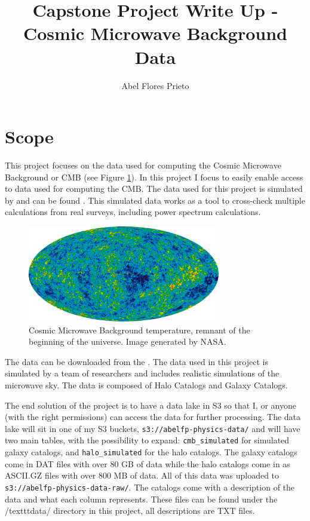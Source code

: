\documentclass[12pt,letterpaper]{article}
\author{Abel Flores Prieto}
\title{Capstone Project Write Up - Cosmic Microwave Background Data}
\newcommand{\MYhref}[3][blue]{\href{#2}{\color{#1}{#3}}}%
\begin{document}
\maketitle

\section*{Scope}
This project focuses on the data used for computing the Cosmic Microwave
Background or CMB (see Figure \ref{fig:cmb}). In this project I focus to easily
enable access to data used for computing the CMB. The data used for this
project is simulated by \MYhref{https://arxiv.org/abs/0908.0540}{Sehgal et al.
(2010)} and can be found
\MYhref{https://lambda.gsfc.nasa.gov/simulation/tb\_sim\_ov.cfm}{here}. This
simulated data works as a tool to cross-check multiple calculations from real
surveys, including power spectrum calculations.

\begin{figure}[h!]
    \centering
    \includegraphics[width=0.75\textwidth]{imgs/cmb_temp.png}
    \caption{Cosmic Microwave Background temperature, remnant of the beginning
    of the universe. Image generated by NASA.}
    \label{fig:cmb}
\end{figure}

The data can be downloaded from the \MYhref{https://lambda.gsfc.nasa.gov}{Legacy
Archive for Microwave Background Data Analysis}. The data used in this project
is simulated by a team of researchers and includes realistic simulations of the
microwave sky. The data is composed of Halo Catalogs and Galaxy Catalogs.

The end solution of the project is to have a data lake in S3 so that I, or
anyone (with the right permissions) can access the data for further processing.
The data lake will sit in one of my S3 buckets,
\texttt{s3://abelfp-physics-data/} and will have two main tables, with the
possibility to expand: \texttt{cmb\_simulated} for simulated galaxy catalogs,
and \texttt{halo\_simulated} for the halo catalogs.
The galaxy catalogs come in DAT files with over 80 GB of data while the halo
catalogs come in as ASCII.GZ files with over 800 MB of data. All of this data
was uploaded to \texttt{s3://abelfp-physics-data-raw/}. The catalogs come with
a description of the data and what each column represents. These files can be
found under the /texttt{data/} directory in this project, all descriptions are
TXT files.
\end{document}
